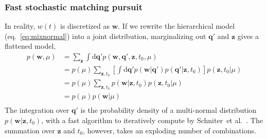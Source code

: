 \subsubsection{Fast stochastic matching pursuit}
\label{subsec:fsmp}
In reality, $w(t)$ is discretized as $\bm{w}$. If we rewrite the hierarchical model (eq.~\eqref{eq:mixnormal}) into a joint distribution, marginalizing out $\bm{q}'$ and $\bm{z}$ gives a flattened model,
\begin{equation}
  \label{eq:universe}
  \begin{aligned}
    p(\bm{w}, \mu) &= \sum_{\bm{z}} \int \mathrm{d}\bm{q}' p(\bm{w}, \bm{q}', \bm{z}, t_0, \mu) \\
    &= p(\mu) \sum_{\bm{z}, t_0} \left[\int \mathrm{d}\bm{q}' p(\bm{w}|\bm{q}') p(\bm{q}'|\bm{z}, t_0) \right] p(\bm{z}, t_0|\mu) \\
    &= p(\mu) \sum_{\bm{z}, t_0} p(\bm{w}|\bm{z}, t_0) p(\bm{z}, t_0|\mu) \\
    &= p(\mu) p(\bm{w}|\mu) \\
  \end{aligned}
\end{equation}
The integration over $\bm{q}'$ is the probability density of a multi-normal distribution $p(\bm{w}|\bm{z}, t_0)$, with a fast algorithm to iteratively compute by Schniter~et al.~\cite{schniter_fast_2008}. The summation over $\bm{z}$ and $t_0$, however, takes an exploding number of combinations.

